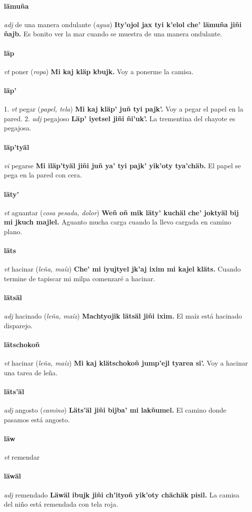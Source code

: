 \documentclass{scrbook}
\newcommand{\entry}[1]{\paragraph{#1}}
\newcommand{\onedefinition}[1]{#1.}
\newcommand{\partofspeech}[1]{\textit{#1}}
\newcommand{\spanishtranslation}[1]{#1}
\newcommand{\clarification}[1]{(\textit{#1})}
\newcommand{\cholexample}[1]{\textbf{#1}}
\newcommand{\exampletranslation}[1]{#1}
\begin{document}
\begin{multicols}{2}
\entry{lämuña}
\partofspeech{adj}
\spanishtranslation{de una manera ondulante}
\clarification{agua}
\cholexample{Ity'ojol jax tyi k'elol che' lämuña jiñi ñajb.}
\exampletranslation{Es bonito ver la mar cuando se muestra de una manera ondulante.}

\entry{läp}
\partofspeech{vt}
\spanishtranslation{poner}
\clarification{ropa}
\cholexample{Mi kaj kläp kbujk.}
\exampletranslation{Voy a ponerme la camisa.}

\entry{läp'}
\onedefinition{1}
\partofspeech{vt}
\spanishtranslation{pegar}
\clarification{papel, tela}
\cholexample{Mi kaj kläp' juñ tyi pajk'.}
\exampletranslation{Voy a pegar el papel en la pared.}
\onedefinition{2}
\partofspeech{adj}
\spanishtranslation{pegajoso}
\cholexample{Läp' iyetsel jiñi ñi'uk'.}
\exampletranslation{La trementina del chayote es pegajosa.}

\entry{läp'tyäl}
\partofspeech{vi}
\spanishtranslation{pegarse}
\cholexample{Mi iläp'tyäl jiñi juñ ya' tyi pajk' yik'oty tya'chäb.}
\exampletranslation{El papel se pega en la pared con cera.}

\entry{läty'}
\partofspeech{vt}
\spanishtranslation{aguantar}
\clarification{cosa pesada, dolor}
\cholexample{Weñ oñ mik läty' kuchäl che' joktyäl bij mi jkuch majlel.}
\exampletranslation{Aguanto mucha carga cuando la llevo cargada en camino plano.}

\entry{läts}
\partofspeech{vt}
\spanishtranslation{hacinar}
\clarification{leña, maíz}
\cholexample{Che' mi iyujtyel jk'aj ixim mi kajel kläts.}
\exampletranslation{Cuando termine de tapiscar mi milpa comenzaré a hacinar.}

\entry{lätsäl}
\partofspeech{adj}
\spanishtranslation{hacinado}
\clarification{leña, maíz}
\cholexample{Machtyojik lätsäl jiñi ixim.}
\exampletranslation{El maíz está hacinado disparejo.}

\entry{lätschokoñ}
\partofspeech{vt}
\spanishtranslation{hacinar}
\clarification{leña, maíz}
\cholexample{Mi kaj klätschokoñ jump'ejl tyarea si'.}
\exampletranslation{Voy a hacinar una tarea de leña.}

\entry{läts'äl}
\partofspeech{adj}
\spanishtranslation{angosto}
\clarification{camino}
\cholexample{Läts'äl jiñi bijba' mi lakñumel.}
\exampletranslation{El camino donde pasamos está angosto.}

\entry{läw}
\partofspeech{vt}
\spanishtranslation{remendar}

\entry{läwäl}
\partofspeech{adj}
\spanishtranslation{remendado}
\cholexample{Läwäl ibujk jiñi ch'ityoñ yik'oty chächäk pisil.}
\exampletranslation{La camisa del niño está remendada con tela roja.}


\end{multicols}
\end{document}
